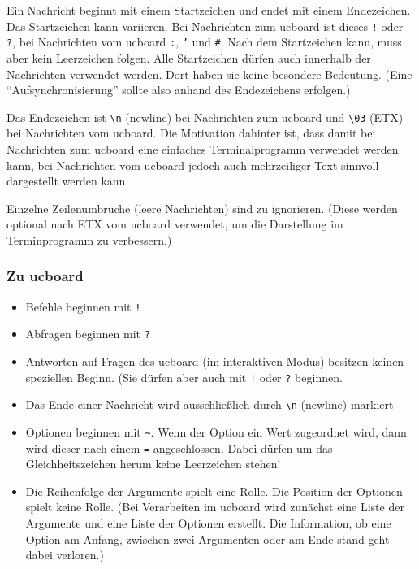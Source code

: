Ein Nachricht beginnt mit einem Startzeichen und endet mit einem Endezeichen. Das Startzeichen kann variieren. Bei Nachrichten zum ucboard ist dieses \texttt{!} oder \texttt{?}, bei Nachrichten vom ucboard \texttt{:}, \texttt{'} und \texttt{\#}. Nach dem Startzeichen kann, muss aber kein Leerzeichen folgen. Alle Startzeichen dürfen auch innerhalb der Nachrichten verwendet werden. Dort haben sie keine besondere Bedeutung. (Eine "`Aufsynchronisierung"' sollte also anhand des Endezeichens erfolgen.)

Das Endezeichen ist \texttt{\textbackslash n} (newline) bei Nachrichten zum ucboard und \texttt{\textbackslash 03} (ETX) bei Nachrichten vom ucboard. Die Motivation dahinter ist, dass damit bei Nachrichten zum ucboard eine einfaches Terminalprogramm verwendet werden kann, bei Nachrichten vom ucboard jedoch auch mehrzeiliger Text sinnvoll dargestellt werden kann.

Einzelne Zeilenumbrüche (leere Nachrichten) sind zu ignorieren. (Diese werden optional nach ETX vom ucboard verwendet, um die Darstellung im Terminprogramm zu verbessern.)


\subsubsection{Zu ucboard}
\begin{itemize}
	\item Befehle beginnen mit \texttt{!}
	\item Abfragen beginnen mit \texttt{?}
	\item Antworten auf Fragen des ucboard (im interaktiven Modus) besitzen keinen speziellen Beginn. (Sie dürfen aber auch mit \texttt{!} oder \texttt{?} beginnen.
	\item Das Ende einer Nachricht wird ausschließlich durch \texttt{\textbackslash n} (newline) markiert
	\item Optionen beginnen mit \verb+~+. Wenn der Option ein Wert zugeordnet wird, dann wird dieser nach einem \texttt{=} angeschlossen. Dabei dürfen um das Gleichheitszeichen herum keine Leerzeichen stehen!
	\item Die Reihenfolge der Argumente spielt eine Rolle. Die Position der Optionen spielt keine Rolle. (Bei Verarbeiten im ucboard wird zunächst eine Liste der Argumente und eine Liste der Optionen erstellt. Die Information, ob eine Option am Anfang, zwischen zwei Argumenten oder am Ende stand geht dabei verloren.)
\end{itemize}


